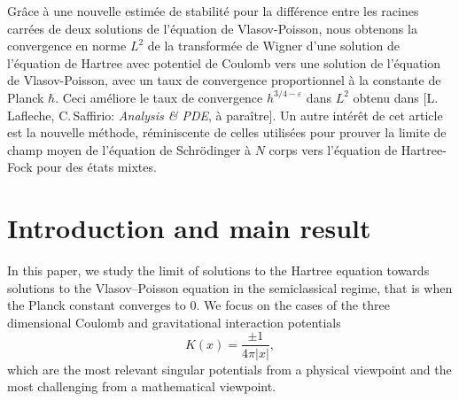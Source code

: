 \documentclass[JEP,XML,SOM,Unicode,NoEqCountersInSection,published]{cedram}
\theoremstyle{definition}
\let\lt\left
\let\rt\right
\renewcommand {\(} {\lt(}
\renewcommand {\)} {\rt)}
\newcommand {\n}[1] {\lt\lvert #1 \rt\rvert}
\begin{document}


\begin{altabstract}
Grâce à une nouvelle estimée de stabilité pour la différence entre les racines carrées de deux solutions de l'équation de Vlasov-Poisson, nous obtenons la convergence en norme $L^2$ de la transformée de Wigner d'une solution de l'équation de Hartree avec potentiel de Coulomb vers une solution de l'équation de Vlasov-Poisson, avec un taux de convergence proportionnel à la constante de Planck $\hbar$. Ceci améliore le taux de convergence $h^{3/4 - \varepsilon}$ dans $L^2$ obtenu dans [L.\,Lafleche, C.\,Saffirio: \textit{Analysis \& PDE}, à paraître]. Un autre intérêt de cet article est la nouvelle méthode, réminiscente de celles utilisées pour prouver la limite de champ moyen de l'équation de Schrödinger à $N$ corps vers l'équation de Hartree-Fock pour des états mixtes.
\end{altabstract}
\maketitle
\vspace*{-1.5\baselineskip}
\tableofcontents


\vspace*{-4\baselineskip}\mbox{}
\section{Introduction and main result}

In this paper, we study the limit of solutions to the Hartree equation towards solutions to the Vlasov--Poisson equation in the semiclassical regime, that is when the Planck constant converges to $0$. We focus on the cases of the three dimensional Coulomb and gravitational interaction potentials
\begin{equation}\label{eq:K}
K(x) = \frac{\pm 1}{4\pi\n{x}},
\end{equation}
which are the most relevant singular potentials from a physical viewpoint and the most challenging from a mathematical viewpoint.
\end{document}
